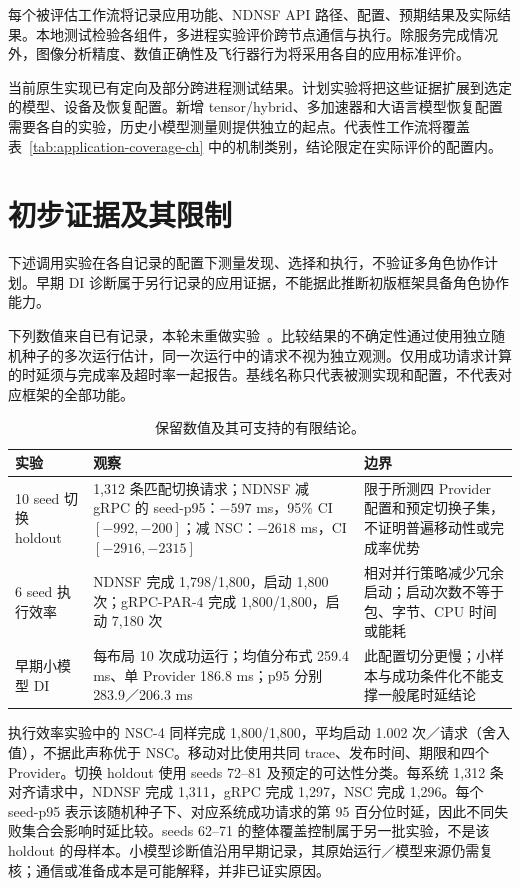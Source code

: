 每个被评估工作流将记录应用功能、NDNSF API 路径、配置、预期结果及实际结果。本地测试检验各组件，多进程实验评价跨节点通信与执行。除服务完成情况外，图像分析精度、数值正确性及飞行器行为将采用各自的应用标准评价。

当前原生实现已有定向及部分跨进程测试结果。计划实验将把这些证据扩展到选定的模型、设备及恢复配置。新增 tensor/hybrid、多加速器和大语言模型恢复配置需要各自的实验，历史小模型测量则提供独立的起点。代表性工作流将覆盖表~\ref{tab:application-coverage-ch} 中的机制类别，结论限定在实际评价的配置内。

\section{初步证据及其限制}
下述调用实验在各自记录的配置下测量发现、选择和执行，不验证多角色协作计划。早期 DI 诊断属于另行记录的应用证据，不能据此推断初版框架具备角色协作能力。

下列数值来自已有记录，本轮未重做实验~\cite{ndnsfevidence}。比较结果的不确定性通过使用独立随机种子的多次运行估计，同一次运行中的请求不视为独立观测。仅用成功请求计算的时延须与完成率及超时率一起报告。基线名称只代表被测实现和配置，不代表对应框架的全部功能。

\begin{table}[htbp]\centering\small
\caption{保留数值及其可支持的有限结论。}
\begin{tabularx}{\textwidth}{p{}XX}
\toprule 实验 & 观察 & 边界\\\midrule
10 seed 切换 holdout & 1,312 条匹配切换请求；NDNSF 减 gRPC 的 seed-p95：$-597$ ms，95\% CI $[-992,-200]$；减 NSC：$-2618$ ms，CI $[-2916,-2315]$ & 限于所测四 Provider 配置和预定切换子集，不证明普遍移动性或完成率优势\\\midrule
6 seed 执行效率 & NDNSF 完成 1,798/1,800，启动 1,800 次；gRPC-PAR-4 完成 1,800/1,800，启动 7,180 次 & 相对并行策略减少冗余启动；启动次数不等于包、字节、CPU 时间或能耗\\\midrule
早期小模型 DI & 每布局 10 次成功运行；均值分布式 259.4 ms、单 Provider 186.8 ms；p95 分别 283.9／206.3 ms & 此配置切分更慢；小样本与成功条件化不能支撑一般尾时延结论\\\bottomrule
\end{tabularx}\end{table}

执行效率实验中的 NSC-4 同样完成 1,800/1,800，平均启动 1.002 次／请求（舍入值），不据此声称优于 NSC。移动对比使用共同 trace、发布时间、期限和四个 Provider。切换 holdout 使用 seeds 72--81 及预定的可达性分类。每系统 1,312 条对齐请求中，NDNSF 完成 1,311，gRPC 完成 1,297，NSC 完成 1,296。每个 seed-p95 表示该随机种子下、对应系统成功请求的第 95 百分位时延，因此不同失败集合会影响时延比较。seeds 62--71 的整体覆盖控制属于另一批实验，不是该 holdout 的母样本。小模型诊断值沿用早期记录，其原始运行／模型来源仍需复核；通信或准备成本是可能解释，并非已证实原因。

